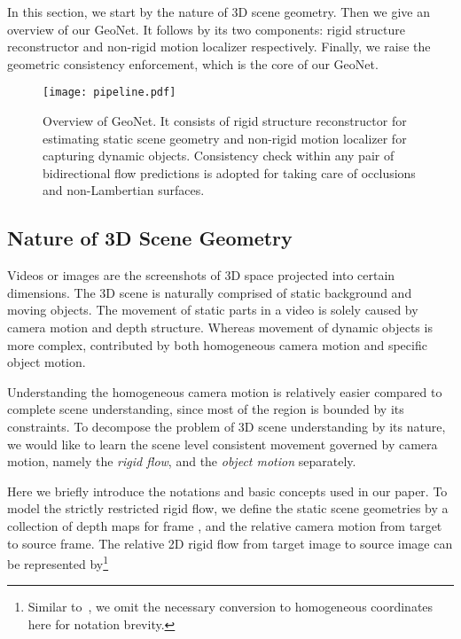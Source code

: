
In this section, we start by the nature of 3D scene geometry. Then we give an overview of our GeoNet. It follows by its two components: rigid structure reconstructor and non-rigid motion localizer respectively. Finally, we raise the geometric consistency enforcement, which is the core of our GeoNet.

\begin{figure*}[t]
\begin{center}
   \texttt{[image: pipeline.pdf]}
\end{center}
\vspace{-1ex}
   \caption{Overview of GeoNet. It consists of rigid structure reconstructor for estimating static scene geometry and non-rigid motion localizer for capturing dynamic objects.
Consistency check within any pair of bidirectional flow predictions is adopted for taking care of occlusions and non-Lambertian surfaces.} \vspace{-2ex}
\label{fig::pipeline}
\end{figure*}
\subsection{Nature of 3D Scene Geometry}\label{sec::3dscene}

Videos or images are the screenshots of 3D space projected into certain dimensions. The 3D scene is naturally comprised of static background and moving objects. The movement of static parts in a video is solely caused by camera motion and depth structure. Whereas movement of dynamic objects is more complex, contributed by both homogeneous camera motion and specific object motion.

Understanding the homogeneous camera motion is relatively easier compared to complete scene understanding, since most of the region is bounded by its constraints. To decompose the problem of 3D scene understanding by its nature, we would like to learn the scene level consistent movement governed by camera motion, namely the \textit{rigid flow}, and the \textit{object motion} separately. 

Here we briefly introduce the notations and basic concepts used in our paper. To model the strictly restricted rigid flow, we define the static scene geometries by a collection of depth maps  for frame , and the relative camera motion  from target to source frame. The relative 2D rigid flow from target image  to source image  can be represented by\footnote{Similar to~\cite{zhou2017unsupervised}, we omit the necessary conversion to homogeneous coordinates here for notation brevity.}

